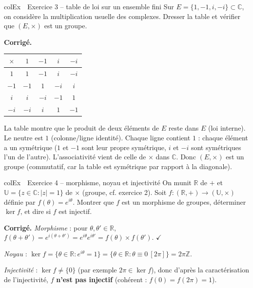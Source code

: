 \documentclass[11pt,a4paper]{article}
\newenvironment{exemple}[1][Exemple]
  {\begin{fiche}{colEx}{\ding{217}~~#1}}{\end{fiche}}
\begin{document}
\begin{exemple}[Exercice 3 -- table de loi sur un ensemble fini]
Sur $E=\{1,-1,i,-i\}\subset\mathbb{C}$, on considère la multiplication usuelle des complexes. Dresser la table et vérifier que $(E,\times)$ est un groupe.

\smallskip
\textbf{Corrigé.}
\begin{center}
\renewcommand{\arraystretch}{1.3}
\begin{tabular}{c|cccc}
$\times$ & $1$ & $-1$ & $i$ & $-i$ \\ \hline
$1$ & $1$ & $-1$ & $i$ & $-i$ \\
$-1$ & $-1$ & $1$ & $-i$ & $i$ \\
$i$ & $i$ & $-i$ & $-1$ & $1$ \\
$-i$ & $-i$ & $i$ & $1$ & $-1$ \\
\end{tabular}
\end{center}
La table montre que le produit de deux éléments de $E$ reste dans $E$ (loi interne). Le neutre est $1$ (colonne/ligne identité). Chaque ligne contient $1$ : chaque élément a un symétrique ($1$ et $-1$ sont leur propre symétrique, $i$ et $-i$ sont symétriques l'un de l'autre). L'associativité vient de celle de $\times$ dans $\mathbb{C}$. Donc $(E,\times)$ est un groupe (commutatif, car la table est symétrique par rapport à la diagonale).
\end{exemple}

\begin{exemple}[Exercice 4 -- morphisme, noyau et injectivité]
On munit $\mathbb{R}$ de $+$ et $\mathbb{U}=\{z\in\mathbb{C}:|z|=1\}$ de $\times$ (groupe, cf. exercice 2). Soit $f:(\mathbb{R},+)\to(\mathbb{U},\times)$ définie par $f(\theta)=e^{i\theta}$. Montrer que $f$ est un morphisme de groupes, déterminer $\ker f$, et dire si $f$ est injectif.

\smallskip
\textbf{Corrigé.} \emph{Morphisme} : pour $\theta,\theta'\in\mathbb{R}$, $f(\theta+\theta')=e^{i(\theta+\theta')}=e^{i\theta}e^{i\theta'}=f(\theta)\times f(\theta')$. $\checkmark$

\smallskip
\emph{Noyau} : $\ker f=\{\theta\in\mathbb{R} : e^{i\theta}=1\}=\{\theta\in\mathbb{R} : \theta\equiv0\ [2\pi]\}=2\pi\mathbb{Z}$.

\smallskip
\emph{Injectivité} : $\ker f\ne\{0\}$ (par exemple $2\pi\in\ker f$), donc d'après la caractérisation de l'injectivité, $f$ \textbf{n'est pas injectif} (cohérent : $f(0)=f(2\pi)=1$).
\end{exemple}
\end{document}
